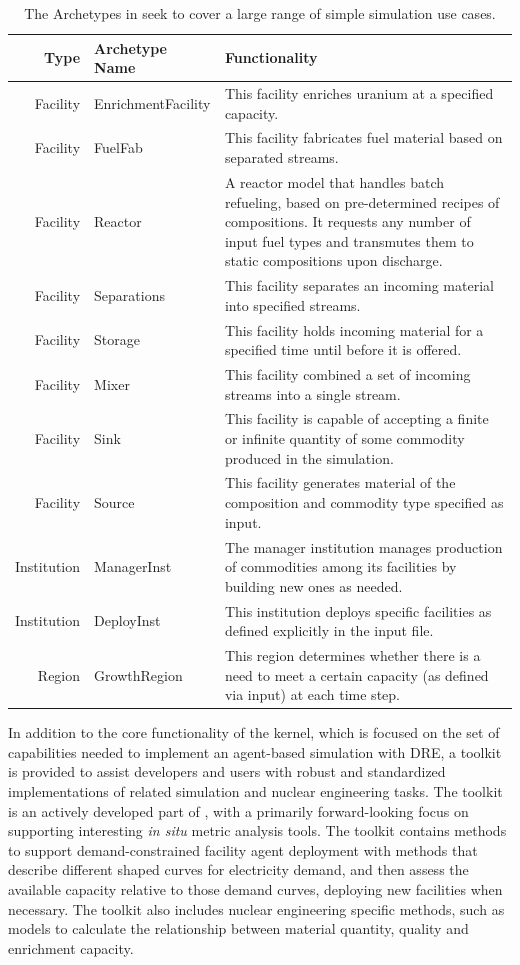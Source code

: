 \begin{table}[ht]
\centering
\caption[List of \Cycamore archetypes.]{The Archetypes in \Cycamore seek to cover a large range of simple
simulation use cases.}
\label{tab:cycamore}
\begin{tabularx}{\textwidth}{rlX}
\hline
\textbf{Type} & \textbf{Archetype Name} & \textbf{Functionality} \\
\hline
Facility & EnrichmentFacility & This facility enriches uranium at a specified capacity. \\
Facility & FuelFab & This facility fabricates fuel material based on separated streams. \\
Facility & Reactor & A reactor model that handles batch refueling, based on pre-determined recipes of compositions. It requests any number of input fuel types and transmutes them to static compositions upon discharge.\\
Facility & Separations & This facility separates an incoming material into specified streams. \\
Facility & Storage & This facility holds incoming material for a specified time until before it is offered. \\
Facility & Mixer & This facility combined a set of incoming streams into a single stream. \\
Facility & Sink & This facility is capable of accepting a finite or infinite quantity of some commodity produced in the simulation. \\
Facility & Source & This facility generates material of the composition and commodity type specified as input.  \\
Institution & ManagerInst & The manager institution manages production of commodities among its facilities by building new ones as needed. \\
Institution & DeployInst &  This institution deploys specific facilities as defined explicitly in the input file. \\
Region & GrowthRegion & This region determines whether there is a need to meet a certain capacity (as defined via input) at each time step. \\
\hline
\end{tabularx}
\end{table}

In addition to the core functionality of the \Cyclus kernel, which is focused
on the set of capabilities needed to implement an agent-based simulation with
\gls{DRE}, a toolkit is provided to assist developers and users with robust
and standardized implementations of related simulation and nuclear engineering
tasks. The toolkit is an actively developed part of \Cyclus, with a primarily
forward-looking focus on supporting interesting \textit{in situ} metric
analysis tools.  The toolkit contains methods to support demand-constrained
facility agent deployment with methods that describe different shaped curves
for electricity demand, and then assess the available capacity relative to
those demand curves, deploying new facilities when necessary.  The toolkit
also includes nuclear engineering specific methods, such as models to
calculate the relationship between material quantity, quality and enrichment
capacity.

